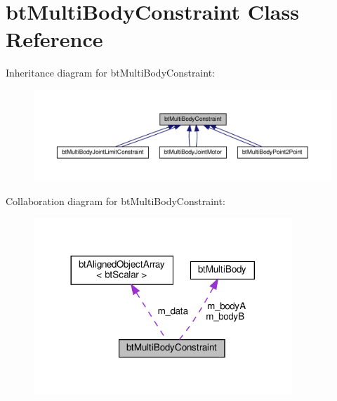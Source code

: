 \hypertarget{classbtMultiBodyConstraint}{}\section{bt\+Multi\+Body\+Constraint Class Reference}
\label{classbtMultiBodyConstraint}


Inheritance diagram for bt\+Multi\+Body\+Constraint\+:
\nopagebreak
\begin{figure}[H]
\begin{center}
\leavevmode
\includegraphics[width=350pt]{classbtMultiBodyConstraint__inherit__graph}
\end{center}
\end{figure}


Collaboration diagram for bt\+Multi\+Body\+Constraint\+:
\nopagebreak
\begin{figure}[H]
\begin{center}
\leavevmode
\includegraphics[width=276pt]{classbtMultiBodyConstraint__coll__graph}
\end{center}
\end{figure}

